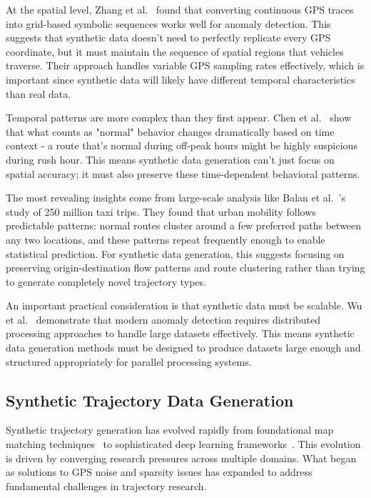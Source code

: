 \documentclass[runningheads]{llncs}
\begin{document}
At the spatial level, Zhang et al.~\cite{zhang2019ibat} found that converting continuous GPS traces into grid-based symbolic sequences works well for anomaly detection. This suggests that synthetic data doesn't need to perfectly replicate every GPS coordinate, but it must maintain the sequence of spatial regions that vehicles traverse. Their approach handles variable GPS sampling rates effectively, which is important since synthetic data will likely have different temporal characteristics than real data.

Temporal patterns are more complex than they first appear. Chen et al.~\cite{chen2021temporal} show that what counts as "normal" behavior changes dramatically based on time context - a route that's normal during off-peak hours might be highly suspicious during rush hour. This means synthetic data generation can't just focus on spatial accuracy; it must also preserve these time-dependent behavioral patterns.

The most revealing insights come from large-scale analysis like Balan et al.~\cite{balan2011real}'s study of 250 million taxi trips. They found that urban mobility follows predictable patterns: normal routes cluster around a few preferred paths between any two locations, and these patterns repeat frequently enough to enable statistical prediction. For synthetic data generation, this suggests focusing on preserving origin-destination flow patterns and route clustering rather than trying to generate completely novel trajectory types.

An important practical consideration is that synthetic data must be scalable. Wu et al.~\cite{wu2024safety} demonstrate that modern anomaly detection requires distributed processing approaches to handle large datasets effectively. This means synthetic data generation methods must be designed to produce datasets large enough and structured appropriately for parallel processing systems.

\subsection{Synthetic Trajectory Data Generation}
\label{sec:generation-review}

Synthetic trajectory generation has evolved rapidly from foundational map matching techniques~\cite{newson2009hidden} to sophisticated deep learning frameworks~\cite{cao2021generating,wang2025gtg}. This evolution is driven by converging research pressures across multiple domains. What began as solutions to GPS noise and sparsity issues has expanded to address fundamental challenges in trajectory research.
\end{document}
